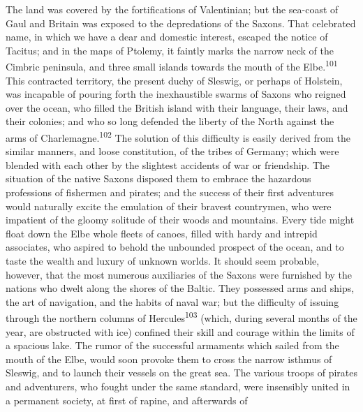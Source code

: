 
The land was covered by the fortifications of Valentinian; but
the sea-coast of Gaul and Britain was exposed to the depredations
of the Saxons. That celebrated name, in which we have a dear and
domestic interest, escaped the notice of Tacitus; and in the maps
of Ptolemy, it faintly marks the narrow neck of the Cimbric
peninsula, and three small islands towards the mouth of the Elbe.\textsuperscript{101}
This contracted territory, the present duchy of Sleswig, or
perhaps of Holstein, was incapable of pouring forth the
inexhaustible swarms of Saxons who reigned over the ocean, who
filled the British island with their language, their laws, and
their colonies; and who so long defended the liberty of the North
against the arms of Charlemagne.\textsuperscript{102} The solution of this
difficulty is easily derived from the similar manners, and loose
constitution, of the tribes of Germany; which were blended with
each other by the slightest accidents of war or friendship. The
situation of the native Saxons disposed them to embrace the
hazardous professions of fishermen and pirates; and the success
of their first adventures would naturally excite the emulation of
their bravest countrymen, who were impatient of the gloomy
solitude of their woods and mountains. Every tide might float
down the Elbe whole fleets of canoes, filled with hardy and
intrepid associates, who aspired to behold the unbounded prospect
of the ocean, and to taste the wealth and luxury of unknown
worlds. It should seem probable, however, that the most numerous
auxiliaries of the Saxons were furnished by the nations who dwelt
along the shores of the Baltic. They possessed arms and ships,
the art of navigation, and the habits of naval war; but the
difficulty of issuing through the northern columns of Hercules\textsuperscript{103}
(which, during several months of the year, are obstructed
with ice) confined their skill and courage within the limits of a
spacious lake. The rumor of the successful armaments which sailed
from the mouth of the Elbe, would soon provoke them to cross the
narrow isthmus of Sleswig, and to launch their vessels on the
great sea. The various troops of pirates and adventurers, who
fought under the same standard, were insensibly united in a
permanent society, at first of rapine, and afterwards of
